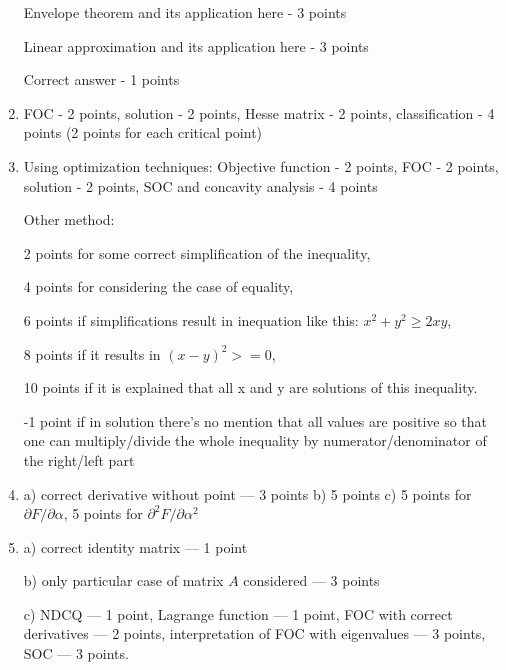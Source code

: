 \begin{enumerate}
  Envelope theorem and its application here - 3 points 
  
  Linear approximation and its application here - 3 points
  
  Correct answer - 1 points

  \item FOC - 2 points, solution - 2 points, Hesse matrix - 2 points, classification - 4 points (2 points for each critical point)

  \item
  Using optimization techniques:
  Objective function - 2 points, FOC - 2 points, solution - 2 points, SOC and concavity analysis - 4 points
  
  Other method:
  
  2 points for some correct simplification of the inequality, 
  
  4 points for considering the case of equality, 
  
  6 points if simplifications result in inequation like this: $x^2+y^2 \geq 2xy$, 
  
  8 points if it results in $(x-y)^2>=0$, 
  
  10 points if it is explained that all x and y are solutions of this inequality.
  
  -1 point if in solution there’s no mention that all values are positive so that one can multiply/divide the whole inequality by numerator/denominator of the right/left part

  \item a) correct derivative without point — 3 points
  b) 5 points
  c) 5 points for $\partial F/\partial \alpha$, 5 points for $\partial^2 F/\partial \alpha^2$

  \item a) correct identity matrix — 1 point

  b) only particular case of matrix $A$ considered — 3 points

  c) NDCQ — 1 point, Lagrange function — 1 point, FOC with correct derivatives — 2 points,
  interpretation of FOC with eigenvalues — 3 points, SOC — 3 points.

\end{enumerate}

